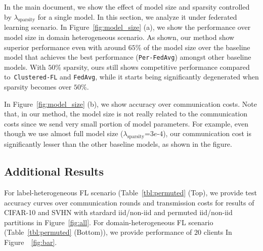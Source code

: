 In the main document, we show the effect of model size and sparsity controlled by  $\lambda_{\text{sparsity}}$ for a single model. In this section, we analyze it under federated learning scenario. In Figure~\ref{fig:model_size} (a), we show the performance over model size in domain heterogeneous scenario. As shown, our method show superior performance even with around $65\%$ of the model size over the baseline model that achieves the best performance (\texttt{Per-FedAvg}) amongst other baseline models. With $50\%$ sparsity, ours still shows competitive performance compared to~\texttt{Clustered-FL} and \texttt{FedAvg}, while it starts being significantly degenerated when sparsity becomes over $50\%$. 



In Figure~\ref{fig:model_size} (b), we show accuracy over communication costs. Note that, in our method, the model size is not really related to the communication costs since we send very small portion of model parameters. For example, even though we use almost full model size ($\lambda_{\text{sparsity}}$=$3e$-$4$), our communication cost is significantly lesser than the other baseline models, as shown in the figure.


\subsection{Additional Results}

For label-heterogeneous FL scenario (Table~\ref{tbl:permuted} (Top), we provide test accuracy curves over communication rounds and transmission costs for results of CIFAR-10 and SVHN with stardard iid/non-iid and permuted iid/non-iid partitions in Figure~\ref{fig:all}. For domain-heterogeneous FL scenario (Table~\ref{tbl:permuted} (Bottom)), we provide performance of $20$ clients In Figure~~\ref{fig:bar}.



